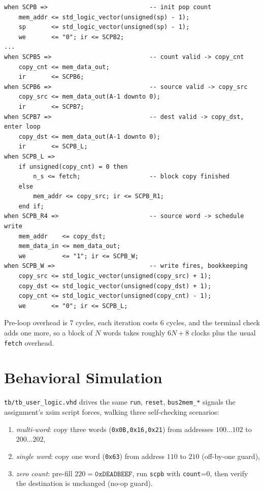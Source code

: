 \documentclass[11pt,letterpaper]{article}
\begin{document}
\begin{lstlisting}[style=vhdlstyle,caption={Core micro-states (excerpt of
\texttt{when SCPB ...} body in \texttt{user\_logic.vhd}).},label={lst:scpb}]
when SCPB =>                            -- init pop count
    mem_addr <= std_logic_vector(unsigned(sp) - 1);
    sp       <= std_logic_vector(unsigned(sp) - 1);
    we       <= "0"; ir <= SCPB2;
...
when SCPB5 =>                           -- count valid -> copy_cnt
    copy_cnt <= mem_data_out;
    ir       <= SCPB6;
when SCPB6 =>                           -- source valid -> copy_src
    copy_src <= mem_data_out(A-1 downto 0);
    ir       <= SCPB7;
when SCPB7 =>                           -- dest valid -> copy_dst, enter loop
    copy_dst <= mem_data_out(A-1 downto 0);
    ir       <= SCPB_L;
when SCPB_L =>
    if unsigned(copy_cnt) = 0 then
        n_s <= fetch;                   -- block copy finished
    else
        mem_addr <= copy_src; ir <= SCPB_R1;
    end if;
when SCPB_R4 =>                         -- source word -> schedule write
    mem_addr    <= copy_dst;
    mem_data_in <= mem_data_out;
    we          <= "1"; ir <= SCPB_W;
when SCPB_W =>                          -- write fires, bookkeeping
    copy_src <= std_logic_vector(unsigned(copy_src) + 1);
    copy_dst <= std_logic_vector(unsigned(copy_dst) + 1);
    copy_cnt <= std_logic_vector(unsigned(copy_cnt) - 1);
    we       <= "0"; ir <= SCPB_L;
\end{lstlisting}

Pre-loop overhead is 7 cycles, each iteration costs 6 cycles, and the
terminal check adds one more, so a block of $N$ words takes roughly
$6N+8$ clocks plus the usual \texttt{fetch} overhead.

\section{Behavioral Simulation}

\texttt{tb/tb\_user\_logic.vhd} drives the same \texttt{run},
\texttt{reset}, \texttt{bus2mem\_*} signals the assignment's xsim script
forces, walking three self-checking scenarios:

\begin{enumerate}
    \item \emph{multi-word}: copy three words
          (\texttt{0x0B,0x16,0x21}) from addresses \(100\ldots102\) to
          \(200\ldots202\),
    \item \emph{single word}: copy one word (\texttt{0x63}) from
          address \(110\) to \(210\) (off-by-one guard),
    \item \emph{zero count}: pre-fill \(220 = \mathtt{0xDEADBEEF}\), run
          \texttt{scpb} with \texttt{count}=0, then verify the
          destination is unchanged (no-op guard).
\end{enumerate}
\end{document}
